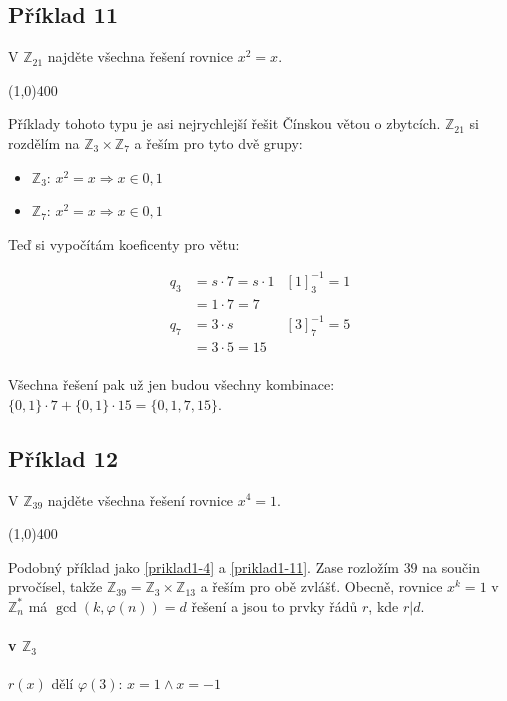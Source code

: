 \documentclass{article}
\begin{document}
\subsection{\label{priklad1-11}Příklad 11}
V $\mathbb{Z}_{21}$ najděte všechna řešení rovnice $x^2 = x$.

\line(1,0){400}

Příklady tohoto typu je asi nejrychlejší řešit Čínskou větou o zbytcích. $\mathbb{Z}_{21}$ si rozdělím na $\mathbb{Z}_{3} \times \mathbb{Z}_{7}$ a řeším pro tyto dvě grupy:

\begin{itemize}
	\item $\mathbb{Z}_{3}$: $x^2 = x \Rightarrow x \in {0,1}$
	\item $\mathbb{Z}_{7}$: $x^2 = x \Rightarrow x \in {0,1}$ 
\end{itemize}

Teď si vypočítám koeficenty pro větu:

\begin{align*}
q_3 & = s\cdot 7 = s\cdot 1 & \left[ 1\right]^{-1}_3 = 1\\
		& = 1 \cdot 7 = 7 \\
q_7 & = 3 \cdot s & \left[ 3\right]^{-1}_{7} = 5\\
		& = 3 \cdot 5 = 15 \\
\end{align*}

Všechna řešení pak už jen budou všechny kombinace: $\{0,1\}\cdot 7 + \{0,1\}\cdot 15 = \{0,1,7,15\}$.

\subsection{\label{priklad1-12}Příklad 12}
V $\mathbb{Z}_{39}$ najděte všechna řešení rovnice $x^4 = 1$.

\line(1,0){400}

Podobný příklad jako \ref{priklad1-4} a \ref{priklad1-11}. Zase rozložím $39$ na součin prvočísel, takže $\mathbb{Z}_{39} = \mathbb{Z}_{3} \times \mathbb{Z}_{13}$ a řeším pro obě zvlášť. Obecně, rovnice $x^k = 1$ v $\mathbb{Z}_n^*$ má $\gcd(k, \varphi(n)) = d$ řešení a jsou to prvky řádů $r$, kde $r|d$.

\paragraph{v $\mathbb{Z}_3$}
$r(x)$ dělí $\varphi(3)$: $x = 1 \wedge x = -1$ 
\end{document}
